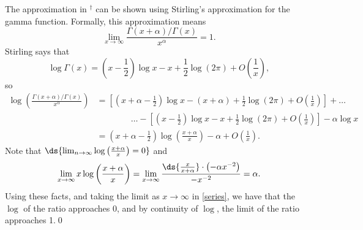 \documentclass{homework}
\begin{document}
  The approximation in $^\dagger$ can be shown using Stirling's approximation for the gamma function.  Formally, this approximation means
  $$
    \lim_{x\to \infty} \frac{\Gamma(x + \alpha)/\Gamma(x)}{x^\alpha} = 1.
  $$
  Stirling says that 
  $$
    \log \Gamma(x) = \left(x-\frac 12\right)\log x - x + \frac 12 \log (2\pi) + O\left(\frac 1x\right),
  $$
  so
  \begin{align}
  \log\left( \frac{\Gamma(x + \alpha)/\Gamma(x)}{x^\alpha} \right) &=
  \left[ \left(x + \alpha -\frac 12\right)\log x - (x+\alpha) + \frac 12 \log (2\pi) + O\left(\frac 1x\right)\right] + \dots \nonumber\\
  & \quad\quad\quad\quad \dots-\left[ \left(x-\frac 12\right)\log x - x + \frac 12 \log (2\pi) + O\left(\frac 1x\right)\right] - \alpha \log x\nonumber\\
  &= \left(x +\alpha - \frac 12\right)\log\left(\frac{x+\alpha}x\right) - \alpha + O\left(\frac 1x\right).\label{series}
  \end{align}
  Note that $\ds{ \lim_{n\to\infty} \log\left(\frac{x+\alpha}x\right) = 0}$ and
  $$
  \lim_{x\to\infty}x\log\left(\frac{x + \alpha}x\right) =
  \lim_{x\to\infty}\frac{\ds{\frac{x}{x+\alpha}} \cdot \left( -\alpha x^{-2} \right)}{ -x^{-2} } =
  \alpha.
  $$
  Using these facts, and taking the limit as $x\to\infty$ in \eqref{series}, we have that the $\log$ of the ratio approaches $0$, and by continuity of $\log$, the limit of the ratio approaches 1.\qed
\end{document}
